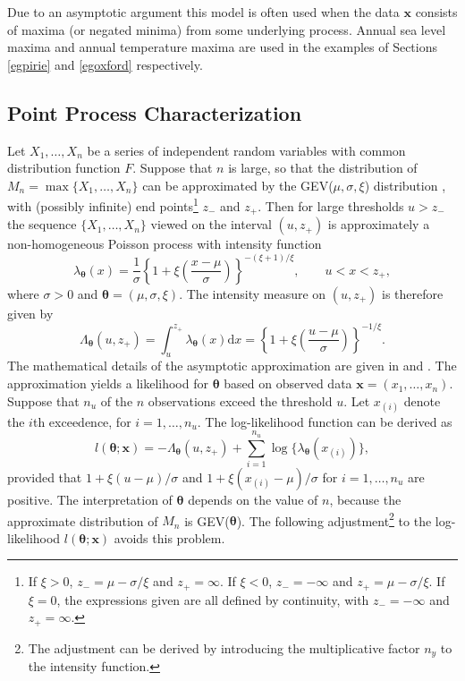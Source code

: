 \documentclass[11pt,a4paper]{article}
\newcommand{\bs}{\boldsymbol}
\begin{document}
Due to an asymptotic argument \citep[e.g.][]{cole01} this model is
often used when the data $\bs{x}$ consists of maxima (or negated
minima) from some underlying process.  Annual sea level maxima and
annual temperature maxima are used in the examples of Sections
\ref{egpirie} and \ref{egoxford} respectively.

\subsection{Point Process Characterization}
\label{lhpp}

Let $X_1,\dots,X_n$ be a series of independent random variables with
common distribution function $F$.  Suppose that $n$ is large, so that
the distribution of $M_n = \max\{X_1,\dots,X_n\}$ can be approximated
by the GEV($\mu,\sigma,\xi$) distribution \citep[e.g.][]{cole01}, with
(possibly infinite) end points\footnote{If $\xi>0$, $z_- =
  \mu-\sigma/\xi$ and $z_+ = \infty$. If $\xi<0$, $z_- = -\infty$ and
  $z_+ = \mu-\sigma/\xi$. If $\xi=0$, the expressions given are all
  defined by continuity, with $z_- = -\infty$ and $z_+ = \infty$.}
$z_-$ and $z_+$.  Then for large thresholds $u > z_-$ the sequence
$\{X_1,\dots,X_n\}$ viewed on the interval $(u,z_+)$ is approximately
a non-homogeneous Poisson process with intensity function
\begin{equation*}
  \lambda_{\bs{\theta}}(x) = \frac{1}{\sigma} \left\{1 +
    \xi\left(\frac{x-\mu}{\sigma}\right)\right\}^{-(\xi+1)/\xi},
  \qquad u < x < z_+, 
\end{equation*}
where $\sigma > 0$ and $\bs{\theta} = (\mu,\sigma,\xi)$.  The
intensity measure on $(u,z_+)$ is therefore given by
\begin{equation*}
  \Lambda_{\bs{\theta}}(u,z_+) = \int_u^{z_+} \lambda_{\bs{\theta}}(x) \text{d}x =
  \left\{1 + \xi\left(\frac{u-\mu}{\sigma}\right)\right\}^{-1/\xi}.
\end{equation*}
The mathematical details of the asymptotic approximation are given in
\citet{pick71} and \citet{smit89}.  The approximation yields a
likelihood for $\bs{\theta}$ based on observed data $\bs{x} =
(x_1,\dots,x_n)$.  Suppose that $n_u$ of the $n$ observations exceed
the threshold $u$.  Let $x_{(i)}$ denote the $i$th exceedence, for
$i=1,\dots,n_u$.  The log-likelihood function can be derived
\citep{cole01} as
\begin{equation*}
  l(\bs{\theta} ; \bs{x}) = -\Lambda_{\bs{\theta}}(u,z_+) +
  \sum_{i=1}^{n_u} \log\{\lambda_{\bs{\theta}}(x_{(i)})\}, 
\end{equation*}
provided that $1 + \xi(u-\mu)/\sigma$ and $1 +
\xi(x_{(i)}-\mu)/\sigma$ for $i=1,\dots,n_u$ are positive.  The
interpretation of $\bs{\theta}$ depends on the value of $n$, because
the approximate distribution of $M_n$ is GEV($\bs{\theta}$).  The
following adjustment\footnote{The adjustment can be derived by
  introducing the multiplicative factor $n_y$ to the intensity
  function.} to the log-likelihood $l(\bs{\theta} ; \bs{x})$ avoids
this problem.
  
\end{document}
